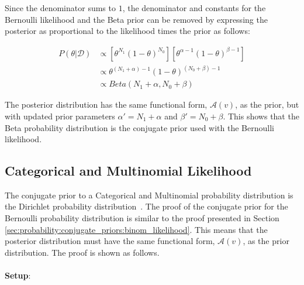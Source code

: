 Since the denominator sums to $1$, the denominator and constants for the Bernoulli likelihood and the Beta prior can be removed by expressing the posterior as proportional to the likelihood times the prior as follows:

\begin{equation}
      \label{eq:probability:conjugate_priors:binom_likelihood:posterior_propto}
      \begin{split}
            P(\theta | \boldsymbol{\mathcal{D}}) &\propto \left[\theta^{N_{1}}(1-\theta)^{N_{0}}\right] \left[\theta^{\alpha - 1} (1 - \theta)^{\beta - 1}\right] \\
            &\propto \theta^{(N_{1} + \alpha) - 1}(1-\theta)^{(N_{0} + \beta) - 1} \\
            &\propto Beta(N_{1} + \alpha, N_{0} + \beta)
      \end{split}
\end{equation}

The posterior distribution has the same functional form, $\mathcal{A}(v)$, as the prior, but with updated prior parameters $\alpha' = N_{1} + \alpha$ and $\beta' = N_{0} + \beta$. This shows that the Beta probability distribution is the conjugate prior used with the Bernoulli likelihood.


\subsection{Categorical and Multinomial Likelihood}
\label{sec:probability:conjugate_priors:cat_mult_likelihood}

The conjugate prior to a Categorical and Multinomial probability distribution is the Dirichlet probability distribution~\cite{ref:wackerly:2014}. The proof of the conjugate prior for the Bernoulli probability distribution is similar to the proof presented in Section \ref{sec:probability:conjugate_priors:binom_likelihood}. This means that the posterior distribution must have the same functional form, $\mathcal{A}(v)$, as the prior distribution. The proof is shown as follows. \\\\
\textbf{Setup}:

